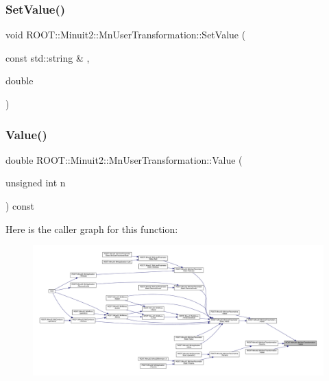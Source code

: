 \subsubsection{\texorpdfstring{SetValue()}{SetValue()}\hspace{0.1cm}{\footnotesize\ttfamily [4/4]}}
{\footnotesize\ttfamily void R\+O\+O\+T\+::\+Minuit2\+::\+Mn\+User\+Transformation\+::\+Set\+Value (\begin{DoxyParamCaption}\item[{const std\+::string \&}]{,  }\item[{double}]{ }\end{DoxyParamCaption})}

\mbox{\label{classROOT_1_1Minuit2_1_1MnUserTransformation_a63d57196d60559aa9df6c9c499cd21d0}} 
\subsubsection{\texorpdfstring{Value()}{Value()}\hspace{0.1cm}{\footnotesize\ttfamily [1/4]}}
{\footnotesize\ttfamily double R\+O\+O\+T\+::\+Minuit2\+::\+Mn\+User\+Transformation\+::\+Value (\begin{DoxyParamCaption}\item[{unsigned int}]{n }\end{DoxyParamCaption}) const}

Here is the caller graph for this function\+:\nopagebreak
\begin{figure}[H]
\begin{center}
\leavevmode
\includegraphics[width=350pt]{d9/d98/classROOT_1_1Minuit2_1_1MnUserTransformation_a63d57196d60559aa9df6c9c499cd21d0_icgraph}
\end{center}
\end{figure}
\mbox{\label{classROOT_1_1Minuit2_1_1MnUserTransformation_a63d57196d60559aa9df6c9c499cd21d0}} 
